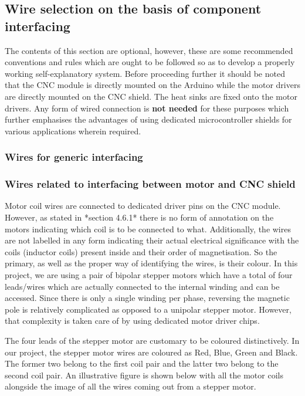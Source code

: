 \subsection{Wire selection on the basis of component interfacing}

The contents of this section are optional, however, these are some recommended conventions and rules which are ought to be followed so as to develop a properly working self-explanatory system. Before proceeding further it should be noted that the CNC module is directly mounted on the Arduino while the motor drivers are directly mounted on the CNC shield. The heat sinks are fixed onto the motor drivers. Any form of wired connection is \textbf{not needed} for these purposes which further emphasises the advantages of using dedicated microcontroller shields for various applications wherein required.

\subsubsection*{Wires for generic interfacing}

\subsubsection*{Wires related to interfacing between motor and CNC shield}

Motor coil wires are connected to dedicated driver pins on the CNC module. However, as stated in *section 4.6.1* there is no form of annotation on the motors indicating which coil is to be connected to what. Additionally, the wires are not labelled in any form indicating their actual electrical significance with the coils (inductor coils) present inside and their order of magnetisation. So the primary, as well as the proper way of identifying the wires, is their colour. In this project, we are using a pair of bipolar stepper motors which have a total of four leads/wires which are actually connected to the internal winding and can be accessed. Since there is only a single winding per phase, reversing the magnetic pole is relatively complicated as opposed to a unipolar stepper motor. However, that complexity is taken care of by using dedicated motor driver chips. \par

The four leads of the stepper motor are customary to be coloured distinctively. In our project, the stepper motor wires are coloured as Red, Blue, Green and Black. The former two belong to the first coil pair and the latter two belong to the second coil pair. An illustrative figure is shown below with all the motor coils alongside the image of all the wires coming out from a stepper motor.

